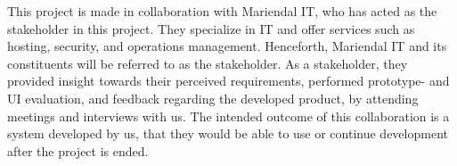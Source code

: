 This project is made in collaboration with Mariendal IT, who has acted as the stakeholder in this project.
They specialize in IT and offer services such as hosting, security, and operations management\cite{Mariendal_OmOs}.
Henceforth, Mariendal IT and its constituents will be referred to as the stakeholder. 
As a stakeholder, they provided insight towards their perceived requirements, performed prototype- and UI evaluation, and feedback regarding the developed product, by attending meetings and interviews with us.
The intended outcome of this collaboration is a system developed by us, that they would be able to use or continue development after the project is ended.



